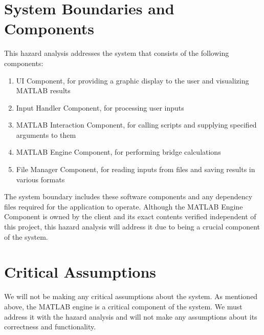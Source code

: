 \documentclass{article}
\begin{document}
\section{System Boundaries and Components}

This hazard analysis addresses the system that consists of the following components:

\begin{enumerate}
	\item UI Component, for providing a graphic display to the user and visualizing MATLAB results
	\item Input Handler Component, for processing user inputs
	\item MATLAB Interaction Component, for calling scripts and supplying specified arguments to them
	\item MATLAB Engine Component, for performing bridge calculations
	\item File Manager Component, for reading inputs from files and saving results in various formats
\end{enumerate}

The system boundary includes these software components and any dependency files required for the application to operate. Although the MATLAB Engine Component is owned by the client and its exact contents verified independent of this project, this hazard analysis will address it due to being a crucial component of the system.

\section{Critical Assumptions}

We will not be making any critical assumptions about the system. As mentioned above, the MATLAB engine 
is a critical component of the system. We must address it with the hazard analysis and will not make
any assumptions about its correctness and functionality.
\end{document}
